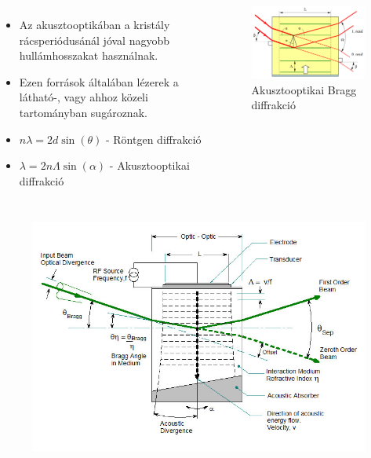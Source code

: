 \documentclass[aspectratio=169]{beamer}
\begin{document}
\begin{frame}

\begin{columns}
\begin{itemize}
\item Az akusztooptikában a kristály rácsperiódusánál jóval nagyobb hullámhosszakat használnak.
\item Ezen források általában lézerek a látható-, vagy ahhoz közeli tartományban sugároznak.
\item $n\lambda=2d\sin(\theta)$ - Röntgen diffrakció
\item $\lambda=2n\Lambda\sin(\alpha)$ - Akusztooptikai diffrakció
\end{itemize}
\begin{figure}
\includegraphics[width=.95\textwidth]{bragg-diff.png}
\caption{Akusztooptikai Bragg diffrakció}
\end{figure}
\end{columns}
\end{frame}

\begin{frame}
\begin{figure}
\includegraphics[width=.8\textwidth]{isomet.jpg}
\end{figure}
\end{frame}
\end{document}
